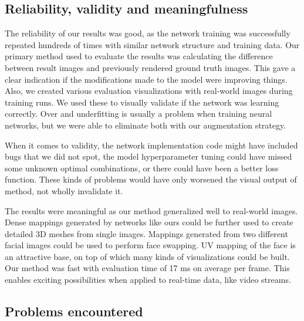 \subsection{Reliability, validity and meaningfulness}

The reliability of our results was good, as the network training was successfully repeated hundreds of times with similar network structure and training data. Our primary method used to evaluate the results was calculating the difference between result images and previously rendered ground truth images. This gave a clear indication if the modifications made to the model were improving things. Also, we created various evaluation visualizations with real-world images during training runs. We used these to visually validate if the network was learning correctly. Over and underfitting is usually a problem when training neural networks, but we were able to eliminate both with our augmentation strategy.

When it comes to validity, the network implementation code might have included bugs that we did not spot, the model hyperparameter tuning could have missed some unknown optimal combinations, or there could have been a better loss function. These kinds of problems would have only worsened the visual output of method, not wholly invalidate it.

The results were meaningful as our method generalized well to real-world images. Dense mappings generated by networks like ours could be further used to create detailed 3D meshes from single images. Mappings generated from two different facial images could be used to perform face swapping. UV mapping of the face is an attractive base, on top of which many kinds of visualizations could be built. Our method was fast with evaluation time of 17 ms on average per frame. This enables exciting possibilities when applied to real-time data, like video streams.

\subsection{Problems encountered}

